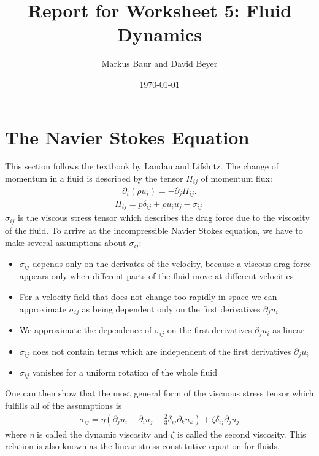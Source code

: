 \documentclass[a4paper,10pt,bibtotoc]{scrartcl}
\begin{document}
\titlehead{Simulation Methods in Physics II \hfill SS 2020}
\title{Report for Worksheet 5: Fluid Dynamics}
\author{Markus Baur and David Beyer}
\date{\today}
\maketitle

\tableofcontents

\section{The Navier Stokes Equation}
This section follows the textbook by Landau and Lifshitz. The change of momentum in a fluid is described by the tensor $\Pi_{ij}$ of momentum flux:
\begin{align}
 \partial_t\left(\rho u_i\right) = -\partial_j \Pi_{ij}.
 \label{eqmom}
\end{align}
\begin{align}
 \Pi_{ij} = p\delta_{ij}  + \rho u_i u_j - \sigma_{ij} \
\end{align}
$\sigma_{ij}$ is the viscous stress tensor which describes the drag force due to the viscosity of the fluid. To arrive at the incompressible Navier Stokes equation, we have to make several assumptions about $\sigma_{ij}$:
\begin{itemize}
 \item $\sigma_{ij}$ depends only on the derivates of the velocity, because a viscous drag force appears only when different parts of the fluid move at different velocities
 \item For a velocity field that does not change too rapidly in space we can approximate $\sigma_{ij}$ as being dependent only on the first derivatives $\partial_j u_i$
 \item We approximate the dependence of $\sigma_{ij}$ on the first derivatives $\partial_j u_i$ as linear
 \item $\sigma_{ij}$ does not contain terms which are independent of the first derivatives $\partial_j u_i$
 \item $\sigma_{ij}$ vanishes for a uniform rotation of the whole fluid
\end{itemize}
One can then show that the most general form of the viscuous stress tensor which fulfills all of the assumptions is
\begin{align}
\sigma_{ij} = \eta\left(\partial_j u_i + \partial_i u_j - \frac{2}{3}\delta_{ij} \partial_k u_k\right) + \zeta \delta_{ij} \partial_j u_j
\label{eqst}
\end{align}
where $\eta$ is called the dynamic viscosity and $\zeta$ is called the second viscosity. This relation is also known as the linear stress constitutive equation for fluids.
\end{document}
